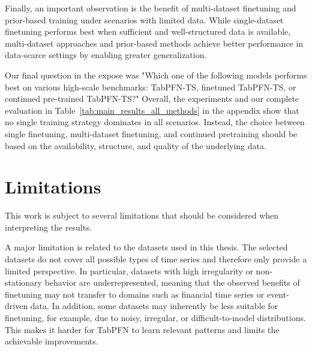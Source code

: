 Finally, an important observation is the benefit of multi-dataset finetuning and prior-based training under scenarios with limited data.
While single-dataset finetuning performs best when sufficient and well-structured data is available, multi-dataset approaches and prior-based methods achieve better performance in data-scarce settings by enabling greater generalization.

Our final question in the expose was "Which one of the following models performs best on various high-scale benchmarks: TabPFN-TS, finetuned TabPFN-TS, or continued pre-trained TabPFN-TS?"
Overall, the experiments and our complete evaluation in Table~\ref{tab:main_results_all_methods} in the appendix show that no single training strategy dominates in all scenarios.
Instead, the choice between single finetuning, multi-dataset finetuning, and continued pretraining should be based on the availability, structure, and quality of the underlying data.










\section{Limitations}
This work is subject to several limitations that should be considered when interpreting the results.

A major limitation is related to the datasets used in this thesis.
The selected datasets do not cover all possible types of time series and therefore only provide a limited perspective.
In particular, datasets with high irregularity or non-stationary behavior are underrepresented, meaning that the observed benefits of finetuning may not transfer to domains such as financial time series or event-driven data.
In addition, some datasets may inherently be less suitable for finetuning, for example, due to noisy, irregular, or difficult-to-model distributions.
This makes it harder for TabPFN to learn relevant patterns and limits the achievable improvements.

